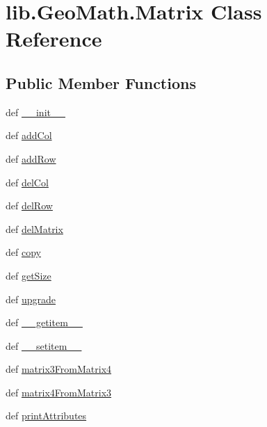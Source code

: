 \hypertarget{classlib_1_1_geo_math_1_1_matrix}{\section{lib.\-Geo\-Math.\-Matrix Class Reference}
\label{classlib_1_1_geo_math_1_1_matrix}
}
\subsection*{Public Member Functions}
\begin{DoxyCompactItemize}
\item 
def \hyperlink{classlib_1_1_geo_math_1_1_matrix_a95d15849acfc9e7911a629ce4841dfc4}{\-\_\-\-\_\-init\-\_\-\-\_\-}
\item 
def \hyperlink{classlib_1_1_geo_math_1_1_matrix_aedb7e72d165b1579acfdc024cfa36825}{add\-Col}
\item 
def \hyperlink{classlib_1_1_geo_math_1_1_matrix_a02264a42c2b881e17e20a69e0cd88200}{add\-Row}
\item 
def \hyperlink{classlib_1_1_geo_math_1_1_matrix_a293a3664ac49722f776856821a37d134}{del\-Col}
\item 
def \hyperlink{classlib_1_1_geo_math_1_1_matrix_a43af57f5d2f89f83ce9ba561298359a5}{del\-Row}
\item 
def \hyperlink{classlib_1_1_geo_math_1_1_matrix_aa4e65dd4ce9fbb34cd68cd78618f894d}{del\-Matrix}
\item 
def \hyperlink{classlib_1_1_geo_math_1_1_matrix_a4fabbad9b65ce6182455df9c5ec8fc05}{copy}
\item 
def \hyperlink{classlib_1_1_geo_math_1_1_matrix_a6905afa34a142074c07956ee5cb5bcf7}{get\-Size}
\item 
def \hyperlink{classlib_1_1_geo_math_1_1_matrix_a6230ebaed7c0c9bb6f1db72bb5a23856}{upgrade}
\item 
def \hyperlink{classlib_1_1_geo_math_1_1_matrix_a0d21352e200a7df7c297141a65646352}{\-\_\-\-\_\-getitem\-\_\-\-\_\-}
\item 
def \hyperlink{classlib_1_1_geo_math_1_1_matrix_a3eb7547d944da4cd477e042a35f73070}{\-\_\-\-\_\-setitem\-\_\-\-\_\-}
\item 
def \hyperlink{classlib_1_1_geo_math_1_1_matrix_a7407473b8cfe56f5c2cc1ed425b28951}{matrix3\-From\-Matrix4}
\item 
def \hyperlink{classlib_1_1_geo_math_1_1_matrix_ae2c4f8eea27dd2494c9abb9a5cab9096}{matrix4\-From\-Matrix3}
\item 
def \hyperlink{classlib_1_1_geo_math_1_1_matrix_afed393c4ec38941f09528fd7c998ec05}{print\-Attributes}

\end{DoxyCompactItemize}
